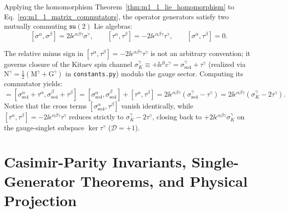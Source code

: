 \begin{proposition}
\label{prop:m1_1_su2_algebras}
Applying the homomorphism Theorem~\ref{thm:m1_1_lie_homomorphism} to Eq.~\eqref{eq:m1_1_matrix_commutators}, the operator generators satisfy two mutually commuting $\mathfrak{su}(2)$ Lie algebras:
\begin{equation}
\label{eq:m1_1_op_comm}
[\sigma^\alpha, \sigma^\beta] = 2\ii \epsilon^{\alpha\beta\gamma} \sigma^\gamma, \qquad [\tau^\alpha, \tau^\beta] = -2\ii \epsilon^{\alpha\beta\gamma} \tau^\gamma, \qquad [\sigma^\alpha, \tau^\beta] = 0.
\end{equation}
\end{proposition}
\begin{remark}
\label{rem:m1_1_gauge_minus_sign}
The relative minus sign in $[\tau^\alpha, \tau^\beta] = -2\ii\epsilon^{\alpha\beta\gamma}\tau^\gamma$ is not an arbitrary convention; it governs closure of the Kitaev spin channel $\sigma_K^\gamma \equiv +\ii c^0 c^\gamma = \sigma_{\mathrm{so4}}^\gamma + \tau^\gamma$ (realized via $\mathrm{N}^\gamma = \frac{1}{2}(\mathrm{M}^\gamma + \mathrm{G}^\gamma)$ in \texttt{constants.py}) modulo the gauge sector. Computing its commutator yields:
\begin{equation}
[\sigma_K^\alpha, \sigma_K^\beta] = [\sigma_{\mathrm{so4}}^\alpha + \tau^\alpha, \sigma_{\mathrm{so4}}^\beta + \tau^\beta] = [\sigma_{\mathrm{so4}}^\alpha, \sigma_{\mathrm{so4}}^\beta] + [\tau^\alpha, \tau^\beta] = 2\ii\epsilon^{\alpha\beta\gamma}(\sigma_{\mathrm{so4}}^\gamma - \tau^\gamma) = 2\ii\epsilon^{\alpha\beta\gamma}(\sigma_K^\gamma - 2\tau^\gamma).
\end{equation}
Notice that the cross terms $[\sigma_{\mathrm{so4}}^\alpha, \tau^\beta]$ vanish identically, while $[\tau^\alpha, \tau^\beta] = -2\ii\epsilon^{\alpha\beta\gamma}\tau^\gamma$ reduces strictly to $\sigma_K^\gamma - 2\tau^\gamma$, closing back to $+2\ii\epsilon^{\alpha\beta\gamma}\sigma_K^\gamma$ on the gauge-singlet subspace $\ker \tau^\gamma$ ($\mathcal{D}=+1$).
\end{remark}

\section{Casimir-Parity Invariants, Single-Generator Theorems, and Physical Projection}
\label{sec:m1_1_casimir_parity}

